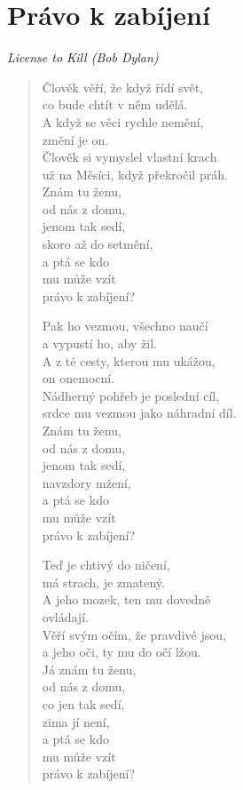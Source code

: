 \section*{Právo k zabíjení}

\textit{License to Kill (Bob Dylan)}

\begin{verse}
 Člověk věří, že když řídí svět,\\ 
 co bude chtít v něm udělá.\\
 A když se věci rychle nemění, \\
 změní je on.\\
 Člověk si vymyslel vlastní krach\\
 už na Měsíci, když překročil práh.\\
 Znám tu ženu,\\
 od nás z domu,\\
 jenom tak sedí,\\
 skoro až do setmění,\\
 a ptá se kdo \\
 mu může vzít \\
 právo k zabíjení?
 
 Pak ho vezmou, všechno naučí \\
 a vypustí ho, aby žil. \\
 A z té cesty, kterou mu ukážou,  \\
 on onemocní. \\
 Nádherný pohřeb je poslední cíl, \\
 srdce mu vezmou jako náhradní díl. \\
 Znám tu ženu, \\
 od nás z domu, \\
 jenom tak sedí, \\
 navzdory mžení, \\
 a ptá se kdo \\
 mu může vzít \\
 právo k zabíjení?
 
 Teď je chtivý do ničení, \\
 má strach, je zmatený. \\
 A jeho mozek, ten mu dovedně \\
 ovládají. \\
 Věří svým očím, že pravdivé jsou, \\
 a jeho oči, ty mu do očí lžou. \\
 Já znám tu ženu, \\
 od nás z domu, \\
 co jen tak sedí, \\
 zima jí není, \\
 a ptá se kdo \\
 mu může vzít \\
 právo k zabíjení?
 

\end{verse}
